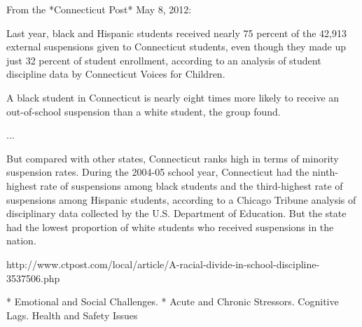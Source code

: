 From the *Connecticut Post* May 8, 2012:

Last year, black and Hispanic students received nearly 75 percent of the 42,913 external suspensions given to Connecticut students, even though they made up just 32 percent of student enrollment, according to an analysis of student discipline data by Connecticut Voices for Children.

A black student in Connecticut is nearly eight times more likely to receive an out-of-school suspension than a white student, the group found.

...

But compared with other states, Connecticut ranks high in terms of minority suspension rates. During the 2004-05 school year, Connecticut had the ninth-highest rate of suspensions among black students and the third-highest rate of suspensions among Hispanic students, according to a Chicago Tribune analysis of disciplinary data collected by the U.S. Department of Education. But the state had the lowest proportion of white students who received suspensions in the nation.

http://www.ctpost.com/local/article/A-racial-divide-in-school-discipline-3537506.php

	* Emotional and Social Challenges.
	* Acute and Chronic Stressors.
Cognitive Lags.
Health and Safety Issues